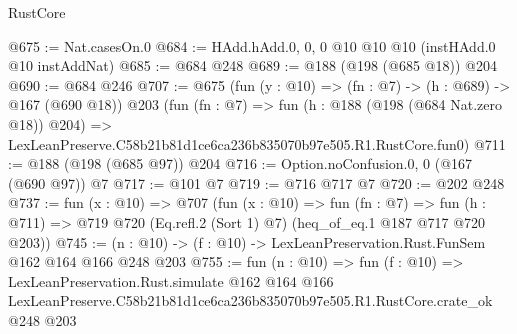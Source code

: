 \begin{lexlean}{RustCore}
\begin{coremodule}
@675 := Nat.casesOn.{0}
@684 := HAdd.hAdd.{0, 0, 0} @10 @10 @10 (instHAdd.{0} @10 instAddNat)
@685 := @684 @248
@689 := @188 (@198 (@685 @18)) @204
@690 := @684 @246
@707 := @675
    (fun (y : @10) => (fn : @7) -> (h : @689) -> @167 (@690 @18))
    @203
    (fun (fn : @7) =>
    fun (h : @188 (@198 (@684 Nat.zero @18)) @204) =>
    LexLeanPreserve.C58b21b81d1ce6ca236b835070b97e505.R1.RustCore.fun0)
@711 := @188 (@198 (@685 @97)) @204
@716 := Option.noConfusion.{0, 0} (@167 (@690 @97)) @7
@717 := @101 @7
@719 := @716 @717 @7
@720 := @202 @248
@737 := fun (x : @10) =>
  @707
    (fun (x : @10) =>
    fun (fn : @7) =>
    fun (h : @711) => @719 @720 (Eq.refl.{2} (Sort 1) @7) (heq_of_eq.{1} @187 @717 @720 @203))
@745 := (n : @10) -> (f : @10) -> LexLeanPreservation.Rust.FunSem @162 @164 @166 @248 @203
@755 := fun (n : @10) =>
  fun (f : @10) =>
  LexLeanPreservation.Rust.simulate
    @162
    @164
    @166
    LexLeanPreserve.C58b21b81d1ce6ca236b835070b97e505.R1.RustCore.crate_ok
    @248
    @203
\end{coremodule}
\end{lexlean}
